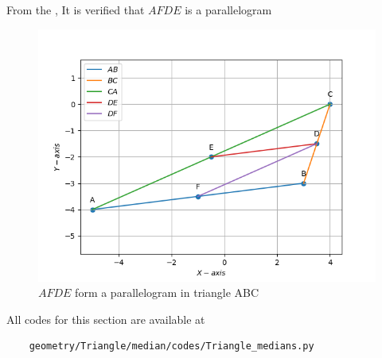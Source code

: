 \documentclass[10pt]{book}
\begin{document}
\begin{enumerate}[label=\thesection.\arabic*.,ref=\thesection.\theenumi]
From the , It is verified that $AFDE$ is a parallelogram\\
\begin{figure}[H]
\centering
\includegraphics[width=\columnwidth]{figs/AFDE_parallelogram.png}
\caption{$AFDE$ form a parallelogram in triangle ABC}
\label{fig:AFDEparallelogram}
\end{figure}
All codes for this section are available at
\begin{lstlisting}
	geometry/Triangle/median/codes/Triangle_medians.py 
\end{lstlisting}
\end{enumerate}
\backmatter
\appendix
\latexprintindex
\end{document}
